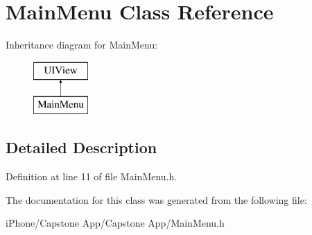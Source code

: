 \hypertarget{interface_main_menu}{\section{Main\-Menu Class Reference}
\label{interface_main_menu}
}
Inheritance diagram for Main\-Menu\-:\begin{figure}[H]
\begin{center}
\leavevmode
\includegraphics[height=2.000000cm]{interface_main_menu}
\end{center}
\end{figure}


\subsection{Detailed Description}


Definition at line 11 of file Main\-Menu.\-h.



The documentation for this class was generated from the following file\-:\begin{DoxyCompactItemize}
\item 
i\-Phone/\-Capstone App/\-Capstone App/Main\-Menu.\-h\end{DoxyCompactItemize}
